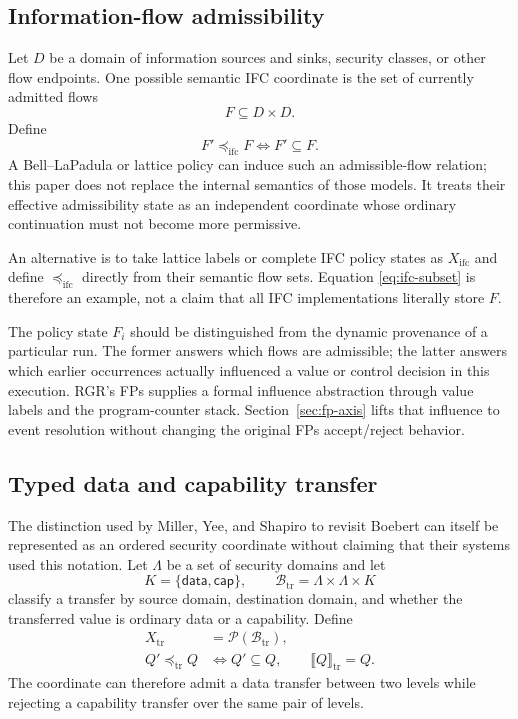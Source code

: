 \documentclass[10pt,twocolumn]{article}
\newcommand{\sem}[1]{\llbracket #1 \rrbracket}
\newcommand{\powerset}{\mathcal{P}}
\begin{document}
\subsection{Information-flow admissibility}

Let $D$ be a domain of information sources and sinks, security classes, or
other flow endpoints.  One possible semantic IFC coordinate is the set of
currently admitted flows
\begin{equation}
  F\subseteq D\times D.
\end{equation}
Define
\begin{equation}
  F'\preceq_{\mathrm{ifc}}F
  \Longleftrightarrow F'\subseteq F.
  \label{eq:ifc-subset}
\end{equation}
A Bell--LaPadula or lattice policy can induce such an admissible-flow relation;
this paper does not replace the internal semantics of those models.  It treats
their effective admissibility state as an independent coordinate whose ordinary
continuation must not become more permissive.

An alternative is to take lattice labels or complete IFC policy states as
$X_{\mathrm{ifc}}$ and define $\preceq_{\mathrm{ifc}}$ directly from their
semantic flow sets.  Equation \eqref{eq:ifc-subset} is therefore an example,
not a claim that all IFC implementations literally store $F$.


The policy state $F_i$ should be distinguished from the dynamic provenance of a
particular run. The former answers which flows are admissible; the latter
answers which earlier occurrences actually influenced a value or control
decision in this execution. RGR's FPs supplies a formal influence abstraction
through value labels and the program-counter stack. Section~\ref{sec:fp-axis}
lifts that influence to event resolution without changing the original FPs
accept/reject behavior.

\subsection{Typed data and capability transfer}

The distinction used by Miller, Yee, and Shapiro to revisit Boebert can itself
be represented as an ordered security coordinate without claiming that their
systems used this notation.  Let $\Lambda$ be a set of security domains and
let
\begin{equation}
  K=\{\mathsf{data},\mathsf{cap}\},
  \qquad
  \mathcal{B}_{\mathrm{tr}}=\Lambda\times\Lambda\times K
\end{equation}
classify a transfer by source domain, destination domain, and whether the
transferred value is ordinary data or a capability.  Define
\begin{align}
  X_{\mathrm{tr}}&=\powerset(\mathcal{B}_{\mathrm{tr}}),\\
  Q'\preceq_{\mathrm{tr}}Q
  &\Longleftrightarrow Q'\subseteq Q,
  \qquad
  \sem{Q}_{\mathrm{tr}}=Q.
\end{align}
The coordinate can therefore admit a data transfer between two levels while
rejecting a capability transfer over the same pair of levels.
\end{document}
